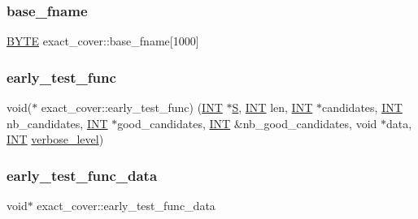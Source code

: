 \mbox{\label{classexact__cover_ac567172bdce6ae702e4a08f01e2c723e}} 
\subsubsection{\texorpdfstring{base\+\_\+fname}{base\_fname}}
{\footnotesize\ttfamily \mbox{\hyperlink{galois_8h_ab6cc7b4aeb6ea31aba2b3fbfc83ff5e6}{B\+Y\+TE}} exact\+\_\+cover\+::base\+\_\+fname\mbox{[}1000\mbox{]}}

\mbox{\label{classexact__cover_a41de15ab23a16d4f722cb0ffa2704bb5}} 
\subsubsection{\texorpdfstring{early\+\_\+test\+\_\+func}{early\_test\_func}}
{\footnotesize\ttfamily void($\ast$ exact\+\_\+cover\+::early\+\_\+test\+\_\+func) (\mbox{\hyperlink{galois_8h_a09fddde158a3a20bd2dcadb609de11dc}{I\+NT}} $\ast$\mbox{\hyperlink{simeon_8_c_adab47f8243f1b5a2c31df2535d6b37d0}{S}}, \mbox{\hyperlink{galois_8h_a09fddde158a3a20bd2dcadb609de11dc}{I\+NT}} len, \mbox{\hyperlink{galois_8h_a09fddde158a3a20bd2dcadb609de11dc}{I\+NT}} $\ast$candidates, \mbox{\hyperlink{galois_8h_a09fddde158a3a20bd2dcadb609de11dc}{I\+NT}} nb\+\_\+candidates, \mbox{\hyperlink{galois_8h_a09fddde158a3a20bd2dcadb609de11dc}{I\+NT}} $\ast$good\+\_\+candidates, \mbox{\hyperlink{galois_8h_a09fddde158a3a20bd2dcadb609de11dc}{I\+NT}} \&nb\+\_\+good\+\_\+candidates, void $\ast$data, \mbox{\hyperlink{galois_8h_a09fddde158a3a20bd2dcadb609de11dc}{I\+NT}} \mbox{\hyperlink{simeon_8_c_a818073fbcc2f439e7c56952f67386122}{verbose\+\_\+level}})}

\mbox{\label{classexact__cover_a374e98bfbc8d4a49b663c5bd28e38e8d}} 
\subsubsection{\texorpdfstring{early\+\_\+test\+\_\+func\+\_\+data}{early\_test\_func\_data}}
{\footnotesize\ttfamily void$\ast$ exact\+\_\+cover\+::early\+\_\+test\+\_\+func\+\_\+data}

